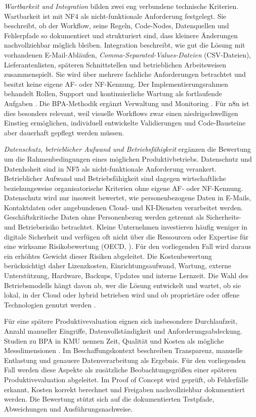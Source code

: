 \documentclass[a4paper,12pt]{article}
\begin{document}
\textit{Wartbarkeit und Integration} bilden zwei eng verbundene technische Kriterien. Wartbarkeit ist mit NF4 als nicht-funktionale Anforderung festgelegt. Sie beschreibt, ob der Workflow, seine Regeln, Code-Nodes, Datenquellen und Fehlerpfade so dokumentiert und strukturiert sind, dass kleinere Änderungen nachvollziehbar möglich bleiben. Integration beschreibt, wie gut die Lösung mit vorhandenen E-Mail-Abläufen, \textit{Comma-Separated-Values-Dateien} (CSV-Dateien), Lieferantenlisten, späteren Schnittstellen und betrieblichen Arbeitsweisen zusammenspielt. Sie wird über mehrere fachliche Anforderungen betrachtet und besitzt keine eigene AF- oder NF-Kennung. Der Implementierungsrahmen behandelt Rollen, Support und kontinuierliche Wartung als fortlaufende Aufgaben \parencite{herm_framework_2023}. Die BPA-Methodik ergänzt Verwaltung und Monitoring \parencite{moreira_methodology_2025}. Für n8n ist dies besonders relevant, weil visuelle Workflows zwar einen niedrigschwelligen Einstieg ermöglichen, individuell entwickelte Validierungen und Code-Bausteine aber dauerhaft gepflegt werden müssen.

\textit{Datenschutz, betrieblicher Aufwand und Betriebsfähigkeit} ergänzen die Bewertung um die Rahmenbedingungen eines möglichen Produktivbetriebs. Datenschutz und Datenhoheit sind in NF5 als nicht-funktionale Anforderung verankert. Betrieblicher Aufwand und Betriebsfähigkeit sind dagegen wirtschaftliche beziehungsweise organisatorische Kriterien ohne eigene AF- oder NF-Kennung. Datenschutz wird nur insoweit bewertet, wie personenbezogene Daten in E-Mails, Kontaktdaten oder angebundenen Cloud- und KI-Diensten verarbeitet werden. Geschäftskritische Daten ohne Personenbezug werden getrennt als Sicherheits- und Betriebsrisiko betrachtet. Kleine Unternehmen investieren häufig weniger in digitale Sicherheit und verfügen oft nicht über die Ressourcen oder Expertise für eine wirksame Risikobewertung (OECD, \citeyear{oecd_digital_2021}). Für den vorliegenden Fall wird daraus ein erhöhtes Gewicht dieser Risiken abgeleitet. Die Kostenbewertung berücksichtigt daher Lizenzkosten, Einrichtungsaufwand, Wartung, externe Unterstützung, Hardware, Backups, Updates und interne Lernzeit. Die Wahl des Betriebsmodells hängt davon ab, wer die Lösung entwickelt und wartet, ob sie lokal, in der Cloud oder hybrid betrieben wird und ob proprietäre oder offene Technologien genutzt werden \parencite{asatiani_deciding_2023}.

Für eine spätere Produktivevaluation eignen sich insbesondere Durchlaufzeit, Anzahl manueller Eingriffe, Datenvollständigkeit und Anforderungsabdeckung. Studien zu BPA in KMU nennen Zeit, Qualität und Kosten als mögliche Messdimensionen \parencite{moreira_business_2024}. Im Beschaffungskontext beschreiben \textcite{flechsig_robotic_2022} Transparenz, manuelle Entlastung und genauere Datenverarbeitung als Ergebnis. Für den vorliegenden Fall werden diese Aspekte als zusätzliche Beobachtungsgrößen einer späteren Produktivevaluation abgeleitet. Im Proof of Concept wird geprüft, ob Fehlerfälle erkannt, Kosten korrekt berechnet und Freigaben nachvollziehbar dokumentiert werden. Die Bewertung stützt sich auf die dokumentierten Testpfade, Abweichungen und Ausführungsnachweise.
\end{document}
